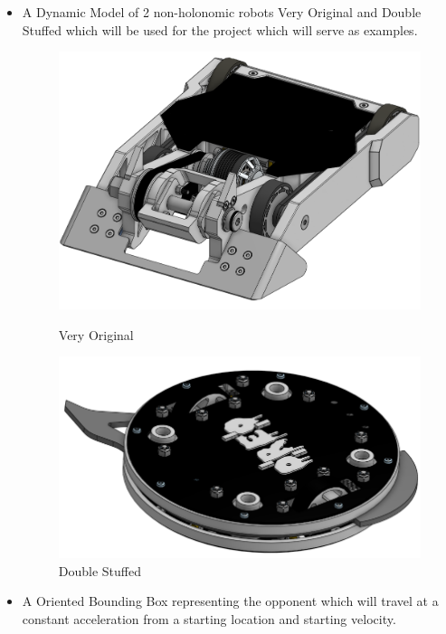 \documentclass[a4 paper]{article}
\begin{document}
\begin{itemize}
	\item A Dynamic Model of 2 non-holonomic robots Very Original and Double Stuffed which will be used for the project which will serve as examples.
	\begin{figure}[htp]
			\centering
			\begin{minipage}{0.45\textwidth}
				\centering
				\includegraphics[scale=0.1]{very-original.png}
				\caption{Very Original}
				\label{Very Original}
			\end{minipage}
			\begin{minipage}{0.45\textwidth}
				\centering
				\includegraphics[scale=0.1]{double_stuffed.png}
				\caption{Double Stuffed}
				\label{Double Stuffed}
			\end{minipage}
		\end{figure}
	\item A Oriented Bounding Box representing the opponent which will travel at a constant acceleration from a starting location and starting velocity.

\end{itemize}
\end{document}
